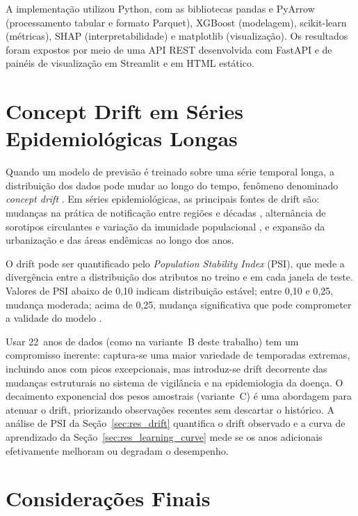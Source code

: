 A implementação utilizou Python, com as bibliotecas pandas e PyArrow (processamento tabular e formato Parquet), XGBoost (modelagem), scikit-learn (métricas), SHAP (interpretabilidade) e matplotlib (visualização). Os resultados foram expostos por meio de uma API REST desenvolvida com FastAPI \cite{fastapi2024} e de painéis de visualização em Streamlit \cite{streamlit2024} e em HTML estático.

\section{Concept Drift em Séries Epidemiológicas Longas}
\label{sec:ref_drift}

Quando um modelo de previsão é treinado sobre uma série temporal longa, a distribuição dos dados pode mudar ao longo do tempo, fenômeno denominado \textit{concept drift} \cite{gama2014survey}. Em séries epidemiológicas, as principais fontes de drift são: mudanças na prática de notificação entre regiões e décadas \cite{coelho2016assessing}, alternância de sorotipos circulantes e variação da imunidade populacional \cite{bhatt2013global}, e expansão da urbanização e das áreas endêmicas ao longo dos anos.

O drift pode ser quantificado pelo \textit{Population Stability Index} (PSI), que mede a divergência entre a distribuição dos atributos no treino e em cada janela de teste. Valores de PSI abaixo de 0,10 indicam distribuição estável; entre 0,10 e 0,25, mudança moderada; acima de 0,25, mudança significativa que pode comprometer a validade do modelo \cite{yurdakul2020statistical}.

Usar 22~anos de dados (como na variante~B deste trabalho) tem um compromisso inerente: captura-se uma maior variedade de temporadas extremas, incluindo anos com picos excepcionais, mas introduz-se drift decorrente das mudanças estruturais no sistema de vigilância e na epidemiologia da doença. O decaimento exponencial dos pesos amostrais (variante~C) é uma abordagem para atenuar o drift, priorizando observações recentes sem descartar o histórico. A análise de PSI da Seção~\ref{sec:res_drift} quantifica o drift observado e a curva de aprendizado da Seção~\ref{sec:res_learning_curve} mede se os anos adicionais efetivamente melhoram ou degradam o desempenho.

\section{Considerações Finais}

